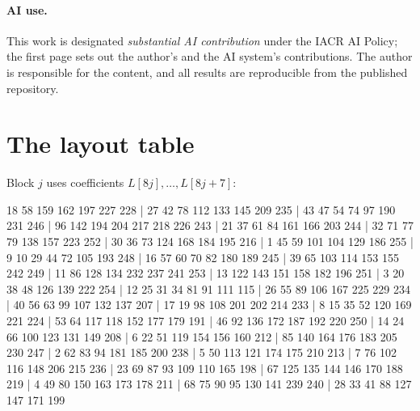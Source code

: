 \documentclass[11pt,a4paper]{article}
\theoremstyle{definition}
\theoremstyle{remark}
\begin{document}
\paragraph{AI use.} This work is designated \emph{substantial AI contribution} under the IACR AI Policy; the first page sets out the author's and the AI system's contributions. The author is responsible for the content, and all results are reproducible from the published repository.

\appendix
\section{The layout table}\label{app:layout}
Block $j$ uses coefficients $L[8j],\dots,L[8j+7]$:\\[2pt]
{\raggedright\footnotesize{} 18 58 159 162 197 227 228 | 27 42 78 112 133 145 209 235 | 43 47 54 74 97 190 231 246 | 96 142 194 204 217 218 226 243 |
21 37 61 84 161 166 203 244 | 32 71 77 79 138 157 223 252 | 30 36 73 124 168 184 195 216 | 1 45 59 101 104 129 186 255 |
9 10 29 44 72 105 193 248 | 16 57 60 70 82 180 189 245 | 39 65 103 114 153 155 242 249 | 11 86 128 134 232 237 241 253 |
13 122 143 151 158 182 196 251 | 3 20 38 48 126 139 222 254 | 12 25 31 34 81 91 111 115 | 26 55 89 106 167 225 229 234 |
40 56 63 99 107 132 137 207 | 17 19 98 108 201 202 214 233 | 8 15 35 52 120 169 221 224 | 53 64 117 118 152 177 179 191 |
46 92 136 172 187 192 220 250 | 14 24 66 100 123 131 149 208 | 6 22 51 119 154 156 160 212 | 85 140 164 176 183 205 230 247 |
2 62 83 94 181 185 200 238 | 5 50 113 121 174 175 210 213 | 7 76 102 116 148 206 215 236 | 23 69 87 93 109 110 165 198 |
67 125 135 144 146 170 188 219 | 4 49 80 150 163 173 178 211 | 68 75 90 95 130 141 239 240 | 28 33 41 88 127 147 171 199}
\end{document}
